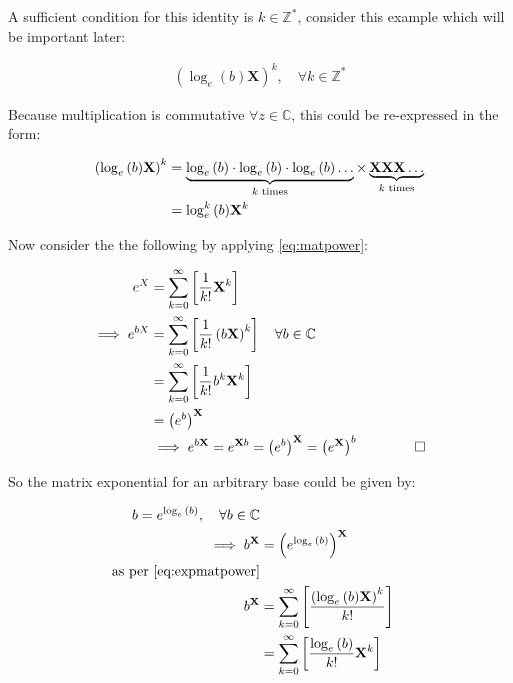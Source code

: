 \documentclass[11pt]{article}
\begin{document}
A sufficient condition for this identity is \(k \in
\mathbb{Z}^{*}\), consider this example which will be important later:

\begin{align}
    \left( \log_e{\left( b \right) }\mathbf{X} \right)^{k} , \quad \forall k \in \mathbb{Z^{*}}
\end{align}

Because multiplication is commutative \(\forall z \in \mathbb{C}\), this could be
re-expressed in the form:

\begin{align}
 \left( \log_e{\left( b \right) }\mathbf{X} \right)^{k} &=    \underbrace{\log_e{\left( b \right) }\cdot  \log_e{\left( b \right) } \cdot  \log_e{\left( b \right) }\ldots }_{k \text{ times}} \times \underbrace{\mathbf{X}\mathbf{X}\mathbf{X}\ldots}_{k \text{ times}} \notag \\
 &= \log_e^k{\left( b \right) } \mathbf{X}^k \label{eq:matpower}
\end{align}

Now consider the the following by applying \eqref{eq:matpower}:

\begin{align}
    e^{X}&= \sum^{\infty}_{k= 0}   \left[ \frac{1}{k!} \mathbf{X}^{k} \right]  \notag \\
    \implies  e^{bX}&= \sum^{\infty}_{k= 0}   \left[ \frac{1}{k!} \left( b\mathbf{X} \right)^{k} \right] \quad \forall b \in \mathbb{C} \notag \\
    &= \sum^{\infty}_{k= 0}   \left[ \frac{1}{k!}b^k \mathbf{X}^k \right] \notag \\
    &= \left( e^b \right)^{\mathbf{X}} \notag \\
    &\implies  e^{b \mathbf{X}} = e^{\mathbf{X}b}= \left( e^b \right)^{\mathbf{X}}= \left( e^{\mathbf{X}} \right)^b  \qquad \qquad \square \label{eq:expmatpower}
\end{align}

So the matrix exponential for an arbitrary base could be given by:

\begin{align}
   b = e^{\log_e{\left( b \right) }}, \quad \forall b \in \mathbb{C} \notag \\
    \implies  b^{\mathbf{X}} &= \left( e^{\log_e{\left( b \right) }} \right)^{\mathbf{X}} \notag \\
     \text{as per \eqref{eq:expmatpower}} \notag \\
     b^{\mathbf{X}} &= \sum^{\infty}_{k= 0}   \left[ \frac{\left( \log_e{\left( b \right) }\mathbf{X} \right)^k}{k!} \right]  \notag \\
     &= \sum^{\infty}_{k= 0}   \left[ \frac{\log_e{\left( b \right) }}{k!}\mathbf{X}^{k} \right] 
\end{align}
\end{document}
